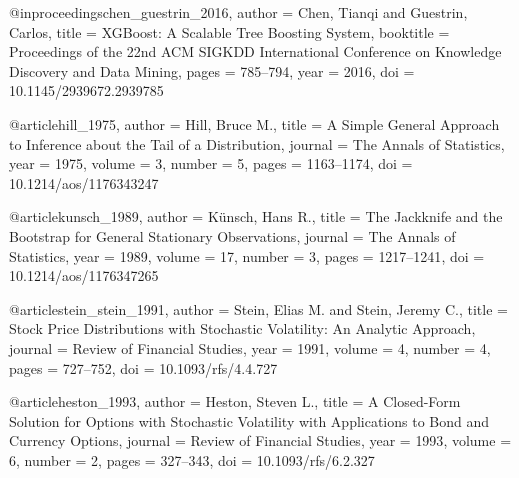 @inproceedings{chen_guestrin_2016,
  author    = {Chen, Tianqi and Guestrin, Carlos},
  title     = {{XGBoost}: A Scalable Tree Boosting System},
  booktitle = {Proceedings of the 22nd ACM SIGKDD International Conference on Knowledge Discovery and Data Mining},
  pages     = {785--794}, year = {2016},
  doi     = {10.1145/2939672.2939785}
}


@article{hill_1975,
  author  = {Hill, Bruce M.},
  title   = {A Simple General Approach to Inference about the Tail of a Distribution},
  journal = {The Annals of Statistics},
  year    = {1975}, volume = {3}, number = {5}, pages = {1163--1174},
  doi     = {10.1214/aos/1176343247}
}


@article{kunsch_1989,
  author  = {K{\"u}nsch, Hans R.},
  title   = {The Jackknife and the Bootstrap for General Stationary Observations},
  journal = {The Annals of Statistics},
  year    = {1989}, volume = {17}, number = {3}, pages = {1217--1241},
  doi     = {10.1214/aos/1176347265}
}




@article{stein_stein_1991,
  author  = {Stein, Elias M. and Stein, Jeremy C.},
  title   = {Stock Price Distributions with Stochastic Volatility: An Analytic Approach},
  journal = {Review of Financial Studies},
  year    = {1991}, volume = {4}, number = {4}, pages = {727--752},
  doi     = {10.1093/rfs/4.4.727}
}


@article{heston_1993,
  author  = {Heston, Steven L.},
  title   = {A Closed-Form Solution for Options with Stochastic Volatility with Applications to Bond and Currency Options},
  journal = {Review of Financial Studies},
  year    = {1993}, volume = {6}, number = {2}, pages = {327--343},
  doi     = {10.1093/rfs/6.2.327}
}


